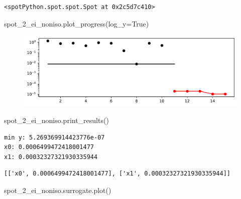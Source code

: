 \documentclass[
  letterpaper,
  DIV=11,
  numbers=noendperiod]{scrreprt}
\newenvironment{Shaded}{\begin{snugshade}}{\end{snugshade}}
\newcommand{\NormalTok}[1]{\textcolor[rgb]{0.00,0.23,0.31}{#1}}
\newcommand{\OperatorTok}[1]{\textcolor[rgb]{0.37,0.37,0.37}{#1}}
\newcommand{\VariableTok}[1]{\textcolor[rgb]{0.07,0.07,0.07}{#1}}
\begin{document}
\begin{verbatim}
<spotPython.spot.spot.Spot at 0x2c5d7c410>
\end{verbatim}

\begin{Shaded}
\begin{Highlighting}[]
\NormalTok{spot\_2\_ei\_noniso.plot\_progress(log\_y}\OperatorTok{=}\VariableTok{True}\NormalTok{)}
\end{Highlighting}
\end{Shaded}

\begin{figure}[H]

{\centering \includegraphics{012_num_spot_ei_files/figure-pdf/cell-15-output-1.pdf}

}

\end{figure}

\begin{Shaded}
\begin{Highlighting}[]
\NormalTok{spot\_2\_ei\_noniso.print\_results()}
\end{Highlighting}
\end{Shaded}

\begin{verbatim}
min y: 5.269369914423776e-07
x0: 0.0006499472418001477
x1: 0.00032327321930335944
\end{verbatim}

\begin{verbatim}
[['x0', 0.0006499472418001477], ['x1', 0.00032327321930335944]]
\end{verbatim}

\begin{Shaded}
\begin{Highlighting}[]
\NormalTok{spot\_2\_ei\_noniso.surrogate.plot()}
\end{Highlighting}
\end{Shaded}
\end{document}

